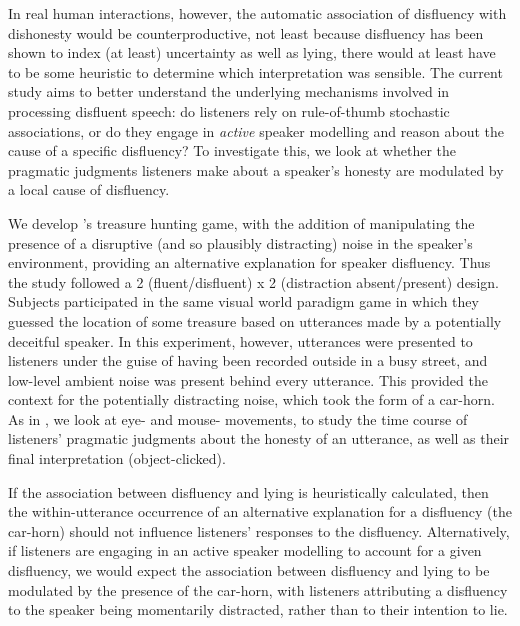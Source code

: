 \documentclass[a4paper,man,natbib]{apa6}
\newcommand*{\term}[1]{\emph{#1}} %
\newcommand*{\citegen}[1]{\citeauthor{#1}'s \citeyear{#1}}
\begin{document}
In real human interactions, however, the automatic association of disfluency with dishonesty would be counterproductive, not least because disfluency has been shown to index (at least) uncertainty as well as lying, there would at least have to be some heuristic to determine which interpretation was sensible.
The current study aims to better understand the underlying mechanisms involved in processing disfluent speech: do listeners rely on rule-of-thumb stochastic associations, or do they engage in \term{active} speaker modelling and reason about the cause of a specific disfluency? 
To investigate this, we look at whether the pragmatic judgments listeners make about a speaker's honesty are modulated by a local cause of disfluency. 


We develop \citegen{Loy2016} treasure hunting game, with the addition of manipulating the presence of a disruptive (and so plausibly distracting) noise in the speaker's environment, providing an alternative explanation for speaker disfluency.
Thus the study followed a 2 (fluent/disfluent) x 2 (distraction absent/present) design.
Subjects participated in the same visual world paradigm game in which they guessed the location of some treasure based on utterances made by a potentially deceitful speaker.
In this experiment, however, utterances were presented to listeners under the guise of having been recorded outside in a busy street, and low-level ambient noise was present behind every utterance.
This provided the context for the potentially distracting noise, which took the form of a car-horn. 
As in \citet{Loy2016}, we look at eye- and mouse- movements, to study the time course of listeners' pragmatic judgments about the honesty of an utterance, as well as their final interpretation (object-clicked).


If the association between disfluency and lying is heuristically calculated, then the within-utterance occurrence of an alternative explanation for a disfluency (the car-horn) should not influence listeners' responses to the disfluency.
Alternatively, if listeners are engaging in an active speaker modelling to account for a given disfluency, we would expect the association between disfluency and lying to be modulated by the presence of the car-horn, with listeners attributing a disfluency to the speaker being momentarily distracted, rather than to their intention to lie.



\end{document}
